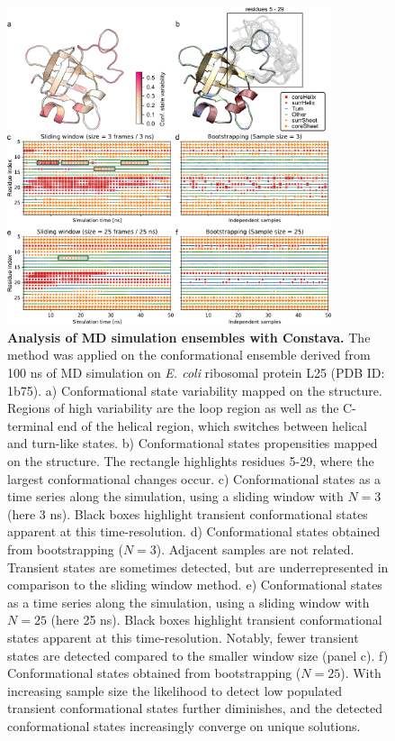 \begin{figure}[H]
    \centering
    \includegraphics[width=0.85\textwidth]{constava/figures_constava/figure3.pdf}
    \caption{
        \textbf{Analysis of MD simulation ensembles with Constava.} The method was applied on the conformational ensemble derived from 100 ns of MD simulation on \textit{E. coli} ribosomal protein L25 (PDB ID: 1b75).
        a) Conformational state variability mapped on the structure. Regions of high variability are the loop region as well as the C-terminal end of the helical region, which switches between helical and turn-like states.
        b) Conformational states propensities mapped on the structure. The rectangle highlights residues 5-29, where the largest conformational changes occur.
        c) Conformational states as a time series along the simulation, using a sliding window with $N = 3$ (here 3 ns). Black boxes highlight transient conformational states apparent at this time-resolution.
        d) Conformational states obtained from bootstrapping ($N = 3$). Adjacent samples are not related. Transient states are sometimes detected, but are underrepresented in comparison to the sliding window method.
        e) Conformational states as a time series along the simulation, using a sliding window with $N = 25$ (here 25 ns). Black boxes highlight transient conformational states apparent at this time-resolution. Notably, fewer transient states are detected compared to the smaller window size (panel c).
        f) Conformational states obtained from bootstrapping ($N = 25$). With increasing sample size the likelihood to detect low populated transient conformational states further diminishes, and the detected conformational states increasingly converge on unique solutions.}
    \label{fig:md_timeseries}
\end{figure}

